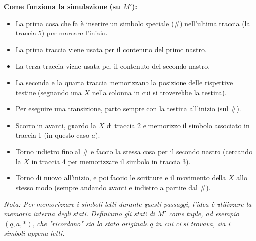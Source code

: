 \begin{center}
    \end{center}

\vspace{0.4cm}
\textbf{Come funziona la simulazione (su $M'$):}
\begin{itemize}
    \item La prima cosa che fa è inserire un simbolo speciale (\#) nell'ultima traccia (la traccia 5) per marcare l'inizio.
    \item La prima traccia viene usata per il contenuto del primo nastro.
    \item La terza traccia viene usata per il contenuto del secondo nastro.
    \item La seconda e la quarta traccia memorizzano la posizione delle rispettive testine (segnando una $X$ nella colonna in cui si troverebbe la testina).
    \item Per eseguire una transizione, parto sempre con la testina all'inizio (sul \#).
    \item Scorro in avanti, guardo la $X$ di traccia 2 e memorizzo il simbolo associato in traccia 1 (in questo caso $a$).
    \item Torno indietro fino al \# e faccio la stessa cosa per il secondo nastro (cercando la $X$ in traccia 4 per memorizzare il simbolo in traccia 3).
    \item Torno di nuovo all'inizio, e poi faccio le scritture e il movimento della $X$ allo stesso modo (sempre andando avanti e indietro a partire dal \#).
\end{itemize}

\textit{Nota: Per memorizzare i simboli letti durante questi passaggi, l'idea è utilizzare la memoria interna degli stati. Definiamo gli stati di $M'$ come tuple, ad esempio $(q, a, *)$, che "ricordano" sia lo stato originale $q$ in cui ci si trovava, sia i simboli appena letti.}


